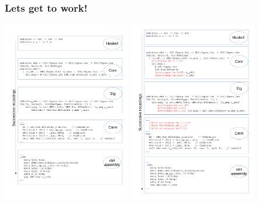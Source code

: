 \documentclass[11pt]{beamer} %
\begin{document}
  \begin{frame}
   \frametitle{Lets get to work!}
   \includegraphics[width=2.2in]{fig/recastings}
   \includegraphics[width=2.2in]{fig/recastings_ticks}
  \end{frame}
\end{document}
